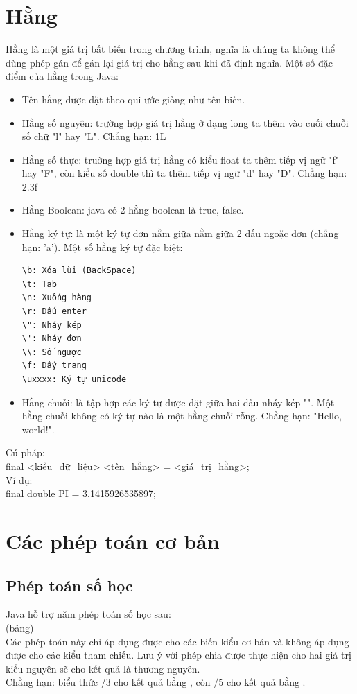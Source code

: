 \section{Hằng}
\indent Hằng là một giá trị bất biến trong chương trình, nghĩa là chúng ta không thể dùng phép gán để gán lại giá trị cho hằng sau khi đã định nghĩa. Một số đặc điểm của hằng trong Java:
\begin{itemize}
\item Tên hằng được đặt theo qui ước giống như tên biến.
\item Hằng số nguyên: trường hợp giá trị hằng ở dạng long ta thêm vào cuối chuỗi số chữ "l" hay "L". Chẳng hạn: 1L
\item Hằng số thực: truờng hợp giá trị hằng có kiểu float ta thêm tiếp vị ngữ "f" hay "F", còn kiểu số double thì ta thêm tiếp vị ngữ "d" hay "D". Chẳng hạn: 2.3f
\item Hằng Boolean: java có 2 hằng boolean là {\ttfamily true, false}.
\item Hằng ký tự: là một ký tự đơn nằm giữa nằm giữa 2 dấu ngoặc đơn (chẳng hạn: 'a'). Một số hằng ký tự đặc biệt:

\begin{verbatim}
\b: Xóa lùi (BackSpace)
\t: Tab
\n: Xuống hàng
\r: Dấu enter
\": Nháy kép
\': Nháy đơn
\\: Số ngược
\f: Đẩy trang
\uxxxx: Ký tự unicode
\end{verbatim}

\item Hằng chuỗi: là tập hợp các ký tự được đặt giữa hai dấu nháy kép "". Một hằng chuỗi không có ký tự nào là một hằng chuỗi rỗng. Chẳng hạn: "Hello, world!".
\end{itemize}

\indent Cú pháp:\\
{\ttfamily final <kiểu\_dữ\_liệu> <tên\_hằng> = <giá\_trị\_hằng>; }\\
\indent Ví dụ:\\
{\ttfamily final double PI = 3.1415926535897;}
\section{Các phép toán cơ bản}
\subsection{Phép toán số học}
\indent Java hỗ trợ năm phép toán số học sau:\\
(bảng)\\
\indent Các phép toán này chỉ áp dụng được cho các biến kiểu cơ bản và không áp dụng được cho các kiểu tham chiếu. Lưu ý với phép chia được thực hiện cho hai giá trị kiểu nguyên sẽ cho kết quả là thương nguyên.\\
\indent Chẳng hạn: biểu thức {/3} cho kết quả bằng {}, còn {/5} cho kết quả bằng {}.
